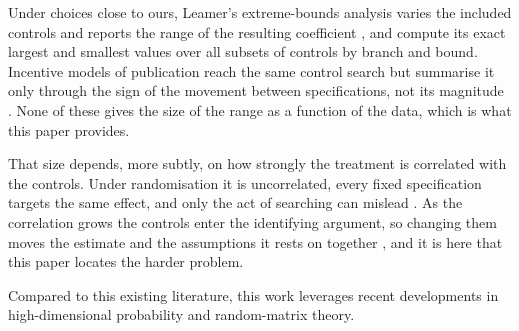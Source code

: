 Under choices close to ours, Leamer's extreme-bounds analysis varies the
included controls and reports the range of the resulting coefficient
\citep{leamer1983con}, and \citet{knaeble2024branch} compute its exact largest
and smallest values over all subsets of controls by branch and bound.  Incentive
models of publication reach the same control search but summarise it only
through the sign of the movement between specifications, not its magnitude
\citep{mccloskey2022incentive}.  None of these gives the size of the range as a
function of the data, which is what this paper provides.  

That size depends, more
subtly, on how strongly the treatment is correlated with the controls. Under
randomisation it is uncorrelated, every fixed specification targets the same
effect, and only the act of searching can mislead
\citep{lin2013agnostic,aronowRobinsSaarinenSavjeSekhon2021}. As the correlation
grows the controls enter the identifying argument, so changing them moves the
estimate and the assumptions it rests on together
\citep{cinelliForneyPearl2022crash,cinelliHazlett2020sensitivity,oster2019unobservable},
and it is here that this paper locates the harder problem.

Compared to this existing literature, this work leverages recent developments in
high-dimensional probability \citep{vershynin2018hdp} and random-matrix theory.

